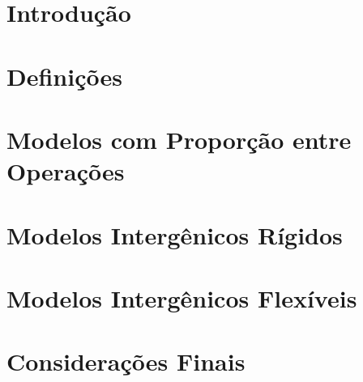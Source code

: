 \documentclass[Portugues,Final]{ic-tese-v3}
\theoremstyle{definition}
\theoremstyle{remark}
\theoremstyle{definition}
\begin{document}


\listoffigures

\listoftables





\tableofcontents


\fimdaspaginasiniciais


\chapter{Introdução}\label{chapter:XDSEJBWV}


\chapter{Definições}\label{chapter:CNDSVAJR}


\chapter{Modelos com Proporção entre Operações}\label{chapter:JWIGFELF}


\chapter{Modelos Intergênicos Rígidos}\label{chapter:DOVAEMLI}


\chapter{Modelos Intergênicos Flexíveis}\label{chapter:GMJBMTWF}


\chapter{Considerações Finais}\label{chapter:IXYEIWKC}








\end{document}
